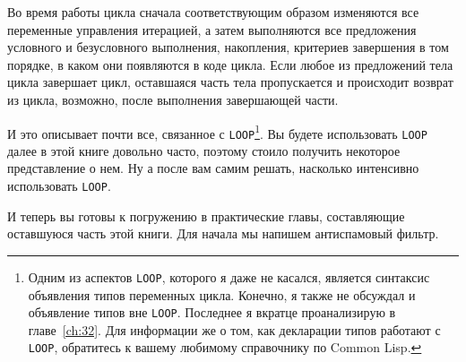 Во время работы цикла сначала соответствующим образом изменяются все переменные управления
итерацией, а затем выполняются все предложения условного и безус\-лов\-но\-го выполнения,
накопления, критериев завершения в том порядке, в каком они появляются в коде цикла. Если
любое из предложений тела цикла завершает цикл, оставшаяся часть тела пропускается и
происходит возврат из цикла, возможно, после выполнения завершающей части.

И это описывает почти все, связанное с \lstinline{LOOP}\footnote{Одним из аспектов
  \lstinline{LOOP}, которого я даже не касался, является синтаксис объявления типов
  переменных цикла. Конечно, я также не обсуждал и объявление типов вне
  \lstinline{LOOP}. Последнее я вкратце проанализирую в главе~\ref{ch:32}. Для информации же о том,
  как декларации типов работают с \lstinline{LOOP}, обратитесь к вашему любимому справочнику
  по Common Lisp.}. Вы будете использовать \lstinline{LOOP} далее в этой книге довольно
часто, поэтому стоило получить некоторое представление о нем. Ну а после вам самим решать,
насколько интенсивно использовать \lstinline{LOOP}.

И теперь вы готовы к погружению в практические главы, составляющие оставшуюся часть этой
книги. Для начала мы напишем антиспамовый фильтр.


